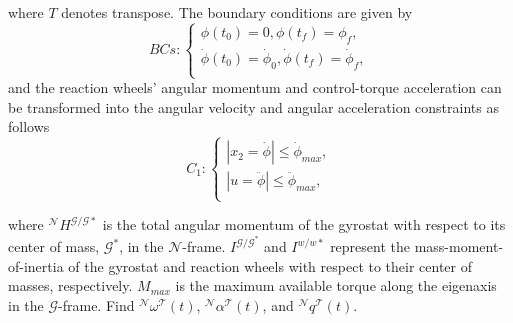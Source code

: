 \documentclass[letterpaper, paper,12pt]{AAS}		%
\begin{document}

	where $T$ denotes transpose. The boundary conditions are given by
	\begin{equation}\label{Bcs}
	BCs:\left\{
	\begin{array}{l}
	\phi(t_0)=0, \phi(t_f)=\phi_{f},\\
	\dot{\phi}(t_0)=\dot{\phi}_{0},\dot{ \phi}(t_f)=\dot{\phi}_{f}, \\
	\end{array}
	\right.
	\end{equation}
	and the reaction wheels' angular momentum and control-torque acceleration can be transformed into the angular velocity and angular acceleration constraints as follows
	\begin{equation}\label{constraints1}
	C_1:\left\{
	\begin{array}{l}
	|x_2=\dot{\phi}|\leq \dot{\phi}_{max},\\
	|u=\ddot{\phi}|\leq \ddot{\phi}_{max},\\
	\end{array}
	\right.
	\end{equation}
	
	
	
where $^\mathcal{N}H^{\mathcal{G/G*}}$ is the total angular momentum of the gyrostat with respect to its center of mass, $\mathcal{G}^*$, in the $\mathcal{N}$-frame. $I^{\mathcal{G/G^*}}$ and $I^{w/w*}$ represent the mass-moment-of-inertia of the gyrostat and reaction wheels with respect to their center of masses, respectively. $M_{max}$ is the maximum available torque along the eigenaxis in the $\mathcal{G}$-frame. Find $^\mathcal{N}\omega^\mathcal{T}(t)$, $^\mathcal{N}\alpha^\mathcal{T}(t)$, and $^\mathcal{N}q^\mathcal{T}(t)$.\\
	
\end{document}
